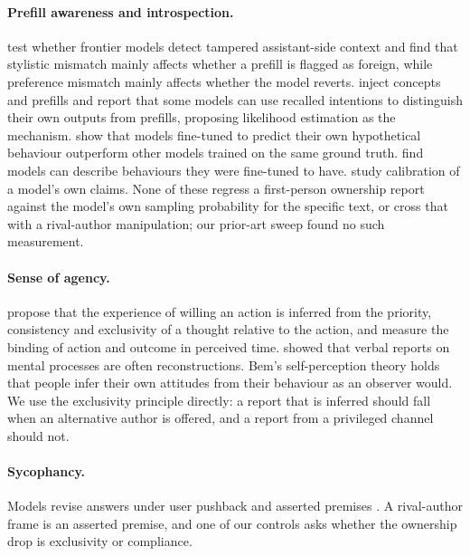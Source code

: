\documentclass[twocolumn,10pt]{article}
\begin{document}
\paragraph{Prefill awareness and introspection.} \citet{wang2026prefill} test whether frontier models detect tampered assistant-side context and find that stylistic mismatch mainly affects whether a prefill is flagged as foreign, while preference mismatch mainly affects whether the model reverts. \citet{lindsey2026emergent} inject concepts and prefills and report that some models can use recalled intentions to distinguish their own outputs from prefills, proposing likelihood estimation as the mechanism. \citet{binder2024looking} show that models fine-tuned to predict their own hypothetical behaviour outperform other models trained on the same ground truth. \citet{betley2025tell} find models can describe behaviours they were fine-tuned to have. \citet{kadavath2022language} study calibration of a model's own claims. None of these regress a first-person ownership report against the model's own sampling probability for the specific text, or cross that with a rival-author manipulation; our prior-art sweep found no such measurement.

\paragraph{Sense of agency.} \citet{wegner1999apparent} propose that the experience of willing an action is inferred from the priority, consistency and exclusivity of a thought relative to the action, and \citet{haggard2002voluntary} measure the binding of action and outcome in perceived time. \citet{nisbett1977telling} showed that verbal reports on mental processes are often reconstructions. Bem's self-perception theory \citep{bem1972selfperception} holds that people infer their own attitudes from their behaviour as an observer would. We use the exclusivity principle directly: a report that is inferred should fall when an alternative author is offered, and a report from a privileged channel should not.

\paragraph{Sycophancy.} Models revise answers under user pushback and asserted premises \citep{sharma2023towards,fanous2025syceval,jain2025interaction}. A rival-author frame is an asserted premise, and one of our controls asks whether the ownership drop is exclusivity or compliance.
\end{document}
